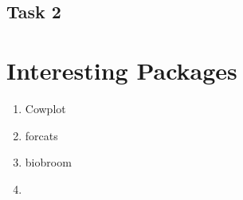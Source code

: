 \documentclass[
]{book}
\begin{document}
\hypertarget{task-2}{%
\section{Task 2}\label{task-2}}

\hypertarget{interesting-packages}{%
\chapter{Interesting Packages}\label{interesting-packages}}

\begin{enumerate}
\def\labelenumi{\arabic{enumi}.}
\item
  Cowplot
\item
  forcats
\item
  biobroom
\item
\end{enumerate}

  
\end{document}
